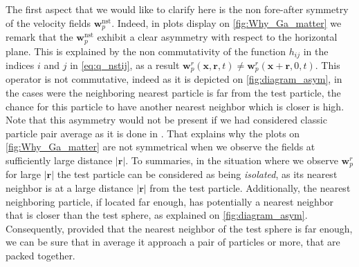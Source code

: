 The first aspect that we would like to clarify here is the non fore-after symmetry of the velocity fields $\textbf{w}_p^\text{nst}$. 
Indeed, in plots display on \ref{fig:Why_Ga_matter} we remark that the $\textbf{w}_p^\text{nst}$ exhibit a clear asymmetry with respect to the horizontal plane.
This is explained by the non commutativity of the function $h_{ij}$ in the indices $i$ and $j$ in \ref{eq:q_nstij}, as a result $\textbf{w}_p^r(\textbf{x},\textbf{r},t) \neq \textbf{w}_p^r(\textbf{x} +  \textbf{r},0,t)$. 
This operator is not commutative, indeed as it is depicted on \ref{fig:diagram_asym}, in the cases were the neighboring nearest particle is far from the test particle, the chance for this particle to have another nearest neighbor which is closer is high. 
Note that this asymmetry would not be present if we had considered classic particle pair average as it is done in \cite{shajahan2023inertial}. 
That explains why the plots on \ref{fig:Why_Ga_matter} are not symmetrical when we observe the fields at sufficiently large distance $|\textbf{r}|$. 
To summaries, in the situation where we observe $\textbf{w}_p^r$ for large $|\textbf{r}|$ the test particle can be considered as being \textit{isolated}, as its nearest neighbor is at a large distance $|\textbf{r}|$ from the test particle. 
Additionally, the nearest neighboring particle, if located far enough, has 
potentially a nearest neighbor that is closer than the test sphere, as explained on \ref{fig:diagram_asym}. 
Consequently, provided that the nearest neighbor of the test sphere is far enough, we can be sure that in average it approach a pair of particles or more, that are packed together. 

